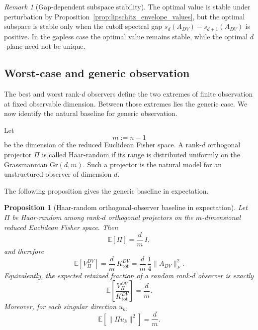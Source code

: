 \documentclass[11pt,a4paper]{article}
\numberwithin{equation}{section}
\theoremstyle{thmcompact}
\newtheorem{proposition}[theorem]{Proposition}
\theoremstyle{remark}
\newtheorem*{remarkplain}{Remark}
\newenvironment{remark}[1][]%
{\begin{remarkbox}\begin{remarkplain}[#1]\normalfont}
		{\end{remarkplain}\end{remarkbox}}
\begin{document}
\begin{remark}[Gap-dependent subspace stability]
The optimal value is stable under perturbation by Proposition~\ref{prop:lipschitz_envelope_values}, but the optimal subspace is stable only when the cutoff spectral gap \(s_d(A_{DV})-s_{d+1}(A_{DV})\) is positive. In the gapless case the optimal value remains stable, while the optimal \(d\)-plane need not be unique.
\end{remark}

\subsection{Worst-case and generic observation}

The best and worst rank-\(d\) observers define the two extremes of finite observation at fixed observable dimension. Between those extremes lies the generic case. We now identify the natural baseline for generic observation.

Let
\begin{equation}
m:=n-1
\end{equation}
be the dimension of the reduced Euclidean Fisher space. A rank-\(d\) orthogonal projector \(\Pi\) is called Haar-random if its range is distributed uniformly on the Grassmannian \(\mathrm{Gr}(d,m)\). Such a projector is the natural model for an unstructured observer of dimension \(d\).

The following proposition gives the generic baseline in expectation.

\begin{proposition}[Haar-random orthogonal-observer baseline in expectation]
\label{thm:random_observer_baseline}
Let \(\Pi\) be Haar-random among rank-\(d\) orthogonal projectors on the \(m\)-dimensional reduced Euclidean Fisher space. Then
\begin{equation}
\mathbb E[\Pi]=\frac{d}{m}\,I,
\end{equation}
and therefore
\begin{equation}
\mathbb E[V_\Pi^{DV}]
=
\frac{d}{m}\,K_{\mathrm{tot}}^{DV}
=
\frac{d}{m}\,\frac14\|A_{DV}\|_F^2.
\end{equation}
Equivalently, the expected retained fraction of a random rank-\(d\) observer is exactly
\begin{equation}
\mathbb E\!\left[\frac{V_\Pi^{DV}}{K_{\mathrm{tot}}^{DV}}\right]
=
\frac{d}{m}.
\end{equation}
Moreover, for each singular direction \(u_k\),
\begin{equation}
\mathbb E[\|\Pi u_k\|^2]=\frac{d}{m}.
\end{equation}
\end{proposition}
\end{document}
